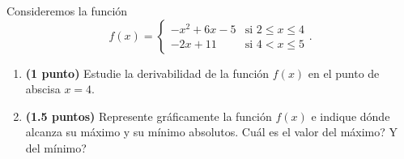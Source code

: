 
Consideremos la función
\[
f(x)=\begin{cases}-x^2+6x-5&\text{si }2\leq x\leq4\\-2x+11&\text{si }4<x\leq5\end{cases}.
\]
\begin{enumerate}[label=\alph*)]
\item \textbf{(1 punto)} Estudie la derivabilidad de la función $f(x)$ en el punto de abscisa $x=4$.
\item \textbf{(1.5 puntos)} Represente gráficamente la función $f(x)$ e indique dónde alcanza su máximo y su mínimo absolutos. \textquestiondown{}Cuál es el valor del máximo? \textquestiondown{}Y del mínimo?
\end{enumerate}
